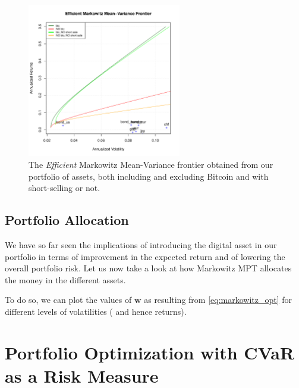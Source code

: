 \begin{figure}
	\centering
	\includegraphics[width=0.6\textwidth]{Images/efficient_frontier.pdf}
	\caption{The \textit{Efficient} Markowitz Mean-Variance frontier obtained from our portfolio of assets, both including and excluding Bitcoin and with short-selling or not.}
	\label{fig:efficient_frontier_comparison}
\end{figure}


\subsection{Portfolio Allocation}
We have so far seen the implications of introducing the digital asset in our portfolio in terms of improvement in the expected return and of lowering the overall portfolio risk.
Let us now take a look at how Markowitz MPT allocates the money in the different assets.

To do so, we can plot the values of $\mathbf{w}$ as resulting from \eqref{eq:markowitz_opt} for different levels of volatilities ( and hence returns).



\section{Portfolio Optimization with CVaR as a Risk Measure}



